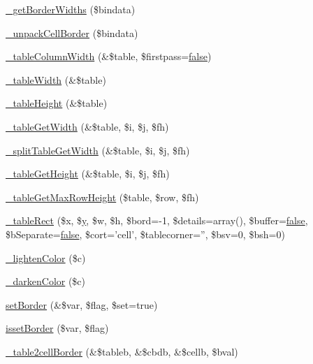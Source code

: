 \begin{DoxyCompactItemize}
\item 
\hyperlink{classm_p_d_f_a79577c8f0ead9dee9df867598569849f}{\-\_\-get\-Border\-Widths} (\$bindata)
\item 
\hyperlink{classm_p_d_f_ad0ffc2daf9dc53f8ef74bb9db034d8e7}{\-\_\-unpack\-Cell\-Border} (\$bindata)
\item 
\hyperlink{classm_p_d_f_a7a78d989faa997b30c91733e7d5cdaa1}{\-\_\-table\-Column\-Width} (\&\$table, \$firstpass=\hyperlink{ttfontsuni_8php_afbaa04e5cc97693dc668b3c45d3dd740}{false})
\item 
\hyperlink{classm_p_d_f_a6b81b9c2b73ce0fa2c38eadf0c551d68}{\-\_\-table\-Width} (\&\$table)
\item 
\hyperlink{classm_p_d_f_aa9893de412655c08ed4e28bee2f1ad2e}{\-\_\-table\-Height} (\&\$table)
\item 
\hyperlink{classm_p_d_f_ad684c99e0e78c06b624190809660d1fd}{\-\_\-table\-Get\-Width} (\&\$table, \$i, \$j, \$fh)
\item 
\hyperlink{classm_p_d_f_a636b9e027c43f069f8c790c7bb7d0e29}{\-\_\-split\-Table\-Get\-Width} (\&\$table, \$i, \$j, \$fh)
\item 
\hyperlink{classm_p_d_f_a7f4f08f41e68cd543b80eace86e7eea7}{\-\_\-table\-Get\-Height} (\&\$table, \$i, \$j, \$fh)
\item 
\hyperlink{classm_p_d_f_ad965488befc93e6d2c30c4ab35e5e5cc}{\-\_\-table\-Get\-Max\-Row\-Height} (\$table, \$row, \$fh)
\item 
\hyperlink{classm_p_d_f_a4f88f2adfb6762065757f25e71466517}{\-\_\-table\-Rect} (\$x, \$\hyperlink{example43___m_p_d_f_i__booklet_8php_a3f83be162d14f38451e1bc419fbbbcbc}{y}, \$w, \$h, \$bord=-\/1, \$details=array(), \$buffer=\hyperlink{ttfontsuni_8php_afbaa04e5cc97693dc668b3c45d3dd740}{false}, \$b\-Separate=\hyperlink{ttfontsuni_8php_afbaa04e5cc97693dc668b3c45d3dd740}{false}, \$cort='cell', \$tablecorner='', \$bsv=0, \$bsh=0)
\item 
\hyperlink{classm_p_d_f_a3648825cbacdd5ff0d2525b61224f201}{\-\_\-lighten\-Color} (\$c)
\item 
\hyperlink{classm_p_d_f_a464a2b7931eac40bb1b52453f589163e}{\-\_\-darken\-Color} (\$c)
\item 
\hyperlink{classm_p_d_f_a62a054a54fac81b835a9ae5a3bc3b1e8}{set\-Border} (\&\$var, \$flag, \$set=true)
\item 
\hyperlink{classm_p_d_f_a9d71b67d3305d3005f7f6e52c4d78b01}{isset\-Border} (\$var, \$flag)
\item 
\hyperlink{classm_p_d_f_a8a5e8bbf435839322cd9a12998c376ed}{\-\_\-table2cell\-Border} (\&\$tableb, \&\$cbdb, \&\$cellb, \$bval)

\end{DoxyCompactItemize}
